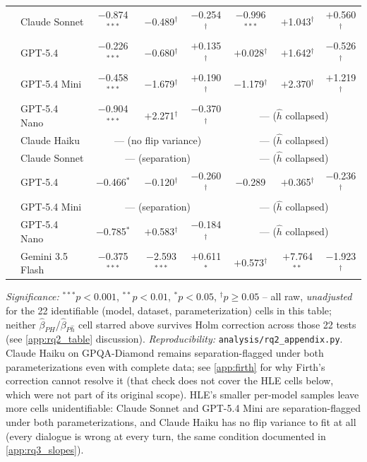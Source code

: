 \begin{table}[t]
\begin{tabular}{ll ccc ccc}
  & Claude Sonnet & $-$0.874$^{***}$ & $-$0.489$^\dagger$ & $-$0.254$^\dagger$ & $-$0.996$^{***}$ & $+$1.043$^\dagger$ & $+$0.560$^\dagger$ \\
  & GPT-5.4 & $-$0.226$^{***}$ & $-$0.680$^\dagger$ & $+$0.135$^\dagger$ & $+$0.028$^\dagger$ & $+$1.642$^\dagger$ & $-$0.526$^\dagger$ \\
  & GPT-5.4 Mini & $-$0.458$^{***}$ & $-$1.679$^\dagger$ & $+$0.190$^\dagger$ & $-$1.179$^\dagger$ & $+$2.370$^\dagger$ & $+$1.219$^\dagger$ \\
  & GPT-5.4 Nano & $-$0.904$^{***}$ & $+$2.271$^\dagger$ & $-$0.370$^\dagger$ & \multicolumn{3}{c}{--- \tiny{($\hat h$ collapsed)}} \\
\addlinespace
\midrule
\multirow{6}{*}{HLE}
 & Claude Haiku & \multicolumn{3}{c}{--- \tiny{(no flip variance)}} & \multicolumn{3}{c}{--- \tiny{($\hat h$ collapsed)}} \\
  & Claude Sonnet & \multicolumn{3}{c}{--- \tiny{(separation)}} & \multicolumn{3}{c}{--- \tiny{($\hat h$ collapsed)}} \\
  & GPT-5.4 & $-$0.466$^{*}$ & $-$0.120$^\dagger$ & $-$0.260$^\dagger$ & $-$0.289$^{}$ & $+$0.365$^\dagger$ & $-$0.236$^\dagger$ \\
  & GPT-5.4 Mini & \multicolumn{3}{c}{--- \tiny{(separation)}} & \multicolumn{3}{c}{--- \tiny{($\hat h$ collapsed)}} \\
  & GPT-5.4 Nano & $-$0.785$^{*}$ & $+$0.583$^\dagger$ & $-$0.184$^\dagger$ & \multicolumn{3}{c}{--- \tiny{($\hat h$ collapsed)}} \\
  & Gemini 3.5 Flash & $-$0.375$^{***}$ & $-$2.593$^{***}$ & $+$0.611$^{*}$ & $+$0.573$^\dagger$ & $+$7.764$^{**}$ & $-$1.923$^\dagger$ \\
\bottomrule 
\end{tabular}
\vspace{2pt}
{\footnotesize\emph{Significance:} $^{***}p{<}0.001$, $^{**}p{<}0.01$, $^{*}p{<}0.05$, $^\dagger p{\geq}0.05$ -- all raw, \emph{unadjusted} for the 22 identifiable (model, dataset, parameterization) cells in this table; neither $\hat\beta_{PH}$/$\hat\beta_{P\hat h}$ cell starred above survives Holm correction across those 22 tests (see \autoref{app:rq2_table} discussion). \emph{Reproducibility:} \texttt{analysis/rq2\_appendix.py}. Claude Haiku on GPQA-Diamond remains separation-flagged under both parameterizations even with complete data; see \autoref{app:firth} for why Firth's correction cannot resolve it (that check does not cover the HLE cells below, which were not part of its original scope). HLE's smaller per-model samples leave more cells unidentifiable: Claude Sonnet and GPT-5.4 Mini are separation-flagged under both parameterizations, and Claude Haiku has no flip variance to fit at all (every dialogue is wrong at every turn, the same condition documented in \autoref{app:rq3_slopes}).}
\end{table}
